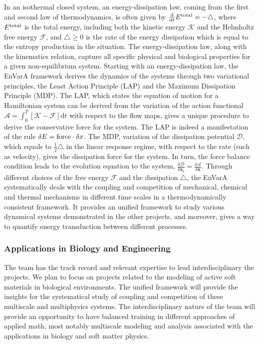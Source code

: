 \documentclass[11pt]{NSFamsart}
\newcommand{\dd}{\mathrm{d}}
\newcommand{\x}{{\bm x}}
\begin{document}
In an isothermal closed system, an energy-dissipation law, coming from the first and second law of thermodynamics, is often given by $\frac{\dd}{\dd t} E^{\rm total} = - \triangle$,
where $E^{\rm total}$ is the total energy, including both the kinetic energy $\mathcal{K}$ and the Helmholtz free energy $\mathcal{F}$, and $\triangle \geq 0$ is the rate of the energy dissipation which is equal to the entropy production in the situation. The energy-dissipation law, along with the kinematics relation, %
capture all specific physical and biological properties for a given non-equilibrium system. Starting with an energy-dissipation law, the EnVarA framework derives the dynamics of the systems through two variational principles, the Least Action Principle (LAP) and the Maximum Dissipation Principle (MDP). The LAP, which states the equation of motion for a Hamiltonian system
can be derived from the variation of the action functional $\mathcal{A} = \int_{0}^T [\mathcal{K} - \mathcal{F}] \dd t$ with respect to the flow maps, gives a unique procedure to derive the conservative force for the system. The LAP is indeed a manifestation of the rule $\delta E = {\rm force} \cdot \delta x$. The MDP, variation of the dissipation potential $\mathcal{D}$, which equals to $\frac{1}{2}\triangle$ in the linear response regime, with respect to the rate (such as velocity), gives the dissipation force for the system. In turn, the force balance condition leads to the evolution equation to the system, $\frac{\delta \mathcal{D}}{\delta \x_t} = \frac{\delta \mathcal{A}}{\delta \x}.$ Through different choices of the free energy $\mathcal{F}$ and the dissipation $\triangle$,
the EnVarA %
systematically deals with the coupling and competition of mechanical, chemical and thermal mechanisms in different time scales in a thermodynamically consistent framework. It 
provides an unified framework to study various
dynamical systems demonstrated in the other projects, and
moreover, gives a way to quantify energy transduction between different processes.  

\subsubsection*{Applications in Biology and Engineering}
The team has the track record and relevant expertise to lead interdisciplinary the projects. We plan to focus on projects related to the modeling of active soft materials in biological environments. 
The unified framework will provide the insights for the systematical
study of coupling and competition of these multiscale and multiphysics systems.
The interdisciplinary nature of the team will provide an opportunity to have balanced training in different approaches of applied math, most notably multiscale modeling and analysis associated with the applications in biology and soft matter physics.
\end{document}
